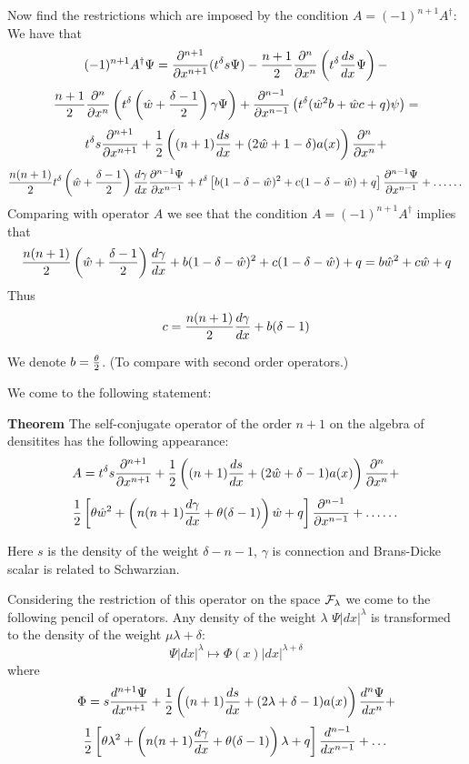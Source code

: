 Now find the restrictions which are imposed by the condition $A=(-1)^{n+1}A^\dagger$:
       We have that
         $$
    (-1)^{n+1}A^\dagger\Psi=
    {\partial^{n+1}\over \partial x^{n+1}}(t^\delta s\Psi)-
    {n+1\over 2}{\partial^{n}\over \partial x^{n}}\left(t^\delta {ds\over dx}\Psi\right)-
             $$
             $$
    {n+1\over 2}{\partial^{n}\over \partial x^{n}}\left(t^\delta \left(\hat w+{\delta-1\over 2}\right)\gamma\Psi\right)+
    {\partial^{n-1}\over \partial x^{n-1}}\left(t^\delta (\hat w^2 b+\hat w c+q)\psi\right)=
         $$
         $$
     t^\delta
    s{\partial^{n+1}\over \partial x^{n+1}}
        +{1\over 2}
        \left(
        (n+1){ds\over dx}+
        (2\hat w+1-\delta)a(x)
               \right) {\partial^{n}\over \partial x^{n}}+
               $$
               $$
        {n(n+1)\over 2}t^\delta \left(\hat w+{\delta-1\over 2}\right){d\gamma\over dx}{\partial ^{n-1}\Psi\over \partial x^{n-1}}+
        t^\delta\left[b(1-\delta-\hat w)^2+c(1-\delta-\hat w)+q\right]{\partial^{n-1}\Psi\over \partial x^{n-1}}+\dots
            \dots    
         $$
         Comparing with operator $A$ we see that the condition $A=(-1)^{n+1}A^\dagger$ implies that
                     $$
                     {n(n+1)\over 2}\left(\hat w+{\delta-1\over 2}\right){d\gamma\over dx}+
                     b(1-\delta-\hat w)^2+c(1-\delta-\hat w)+q=
                     b \hat w^2+c\hat w+q
                     $$
Thus
                $$
             c={n(n+1)\over 2}
             {d \gamma\over dx}+b(\delta-1)   
                $$

We denote $b={\theta\over 2}$. (To compare with second order operators.)

We come to the following statement:

  {\bf Theorem} The self-conjugate operator of the order $n+1$ on the algebra of densitites has the following appearance:
                    $$
            A=t^\delta
    s{\partial^{n+1}\over \partial x^{n+1}}
        +{1\over 2}
        \left(
        (n+1){ds\over dx}+
        (2\hat w+\delta-1)a(x)
               \right) {\partial^{n}\over \partial x^{n}}+
               $$
               $$
               {1\over 2}\left[
               \theta\hat w^2+\left(n(n+1){d\gamma\over dx}+\theta(\delta-1)\right) \hat w+q
               \right]{\partial^{n-1}\over \partial x^{n-1}}+\dots
            \dots
                                      $$

Here $s$ is the density of the weight $\delta-n-1$, $\gamma$ is connection
and Brans-Dicke scalar is related to Schwarzian.

Considering the restriction of this operator on the space  $\cal F_\lambda$ 
we come to the following pencil of operators.
Any density of the weight $\lambda$  $\Psi|dx|^\lambda$ is transformed to the density
of the weight $\mu\lambda+\delta$:
              $$
 \Psi|dx|^\lambda\mapsto \Phi(x)|dx|^{\lambda+\delta}
    $$
    where
              $$
              \Phi=             
    s{d^{n+1}\Psi\over d x^{n+1}}
        +{1\over 2}
        \left(
        (n+1){ds\over dx}+
        (2\lambda+\delta-1)a(x)
               \right) {d^{n}\Psi\over d x^{n}}+
               $$
               $$
               {1\over 2}\left[
               \theta \lambda^2+\left(n(n+1){d\gamma\over dx}+\theta(\delta-1)\right) \lambda+q
               \right]{d^{n-1}\over d x^{n-1}}+\dots
              $$

